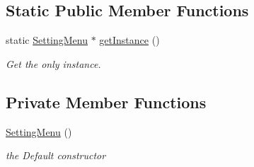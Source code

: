 \subsection*{Static Public Member Functions}
\begin{DoxyCompactItemize}
\item 
\mbox{\label{class_setting_menu_a0e3c24b536a6e4adb4a9237a4c6fa1db}} 
static \mbox{\hyperlink{class_setting_menu}{Setting\+Menu}} $\ast$ \mbox{\hyperlink{class_setting_menu_a0e3c24b536a6e4adb4a9237a4c6fa1db}{get\+Instance}} ()
\begin{DoxyCompactList}\small\item\em Get the only instance. \end{DoxyCompactList}\end{DoxyCompactItemize}
\subsection*{Private Member Functions}
\begin{DoxyCompactItemize}
\item 
\mbox{\label{class_setting_menu_aa446f9fe63b13a8512c9a26cbb0d7eae}} 
\mbox{\hyperlink{class_setting_menu_aa446f9fe63b13a8512c9a26cbb0d7eae}{Setting\+Menu}} ()
\begin{DoxyCompactList}\small\item\em the Default constructor \end{DoxyCompactList}\end{DoxyCompactItemize}
